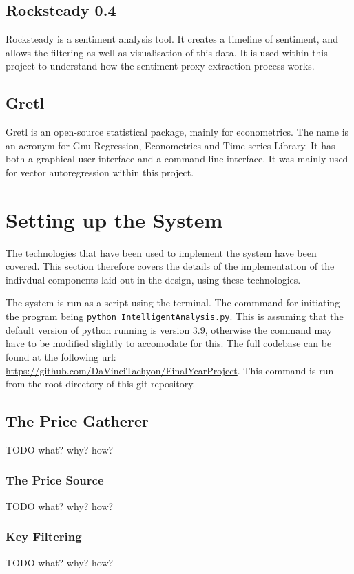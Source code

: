 \subsection{Rocksteady 0.4}

Rocksteady is a sentiment analysis tool. It creates a timeline of sentiment, and allows the filtering as well as visualisation of this data. It is used within this project to understand how the sentiment proxy extraction process works.

\subsection{Gretl}

Gretl is an open-source statistical package, mainly for econometrics. The name is an acronym for Gnu Regression, Econometrics and Time-series Library. It has both a graphical user interface and a command-line interface. It was mainly used for vector autoregression within this project.

\section{Setting up the System}

The technologies that have been used to implement the system have been covered. This section therefore covers the details of the implementation of the indivdual components laid out in the design, using these technologies.

The system is run as a script using the terminal. The commmand for initiating the program being \verb|python IntelligentAnalysis.py|. This is assuming that the default version of python running is version 3.9, otherwise the command may have to be modified slightly to accomodate for this. The full codebase can be found at the following url: \url{https://github.com/DaVinciTachyon/FinalYearProject}. This command is run from the root directory of this git repository.

\subsection{The Price Gatherer}
TODO what? why? how?
\subsubsection{The Price Source}
TODO what? why? how?
\subsubsection{Key Filtering}
TODO what? why? how?
